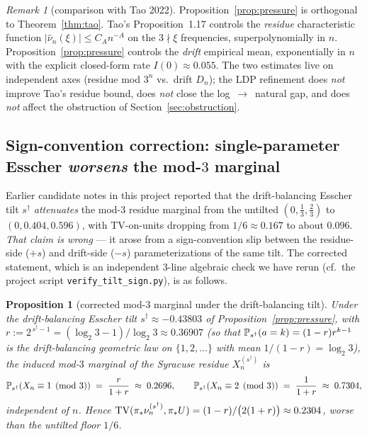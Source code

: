 \documentclass[11pt]{amsart}
\newtheorem{proposition}[theorem]{Proposition}
\theoremstyle{definition}
\theoremstyle{remark}
\newtheorem{remark}[theorem]{Remark}
\begin{document}
\begin{remark}[comparison with Tao 2022]\label{rem:tao-compare}
Proposition~\ref{prop:pressure} is orthogonal to Theorem~\ref{thm:tao}. Tao's Proposition~1.17 controls
the \emph{residue} characteristic function $|\widehat\nu_n(\xi)|\le C_A n^{-A}$ on the $3\nmid\xi$
frequencies, superpolynomially in $n$. Proposition~\ref{prop:pressure} controls the \emph{drift}
empirical mean, exponentially in $n$ with the explicit closed-form rate $I(0)\approx 0.055$. The two
estimates live on independent axes (residue mod $3^n$ vs.\ drift $D_n$); the LDP refinement does
\emph{not} improve Tao's residue bound, does \emph{not} close the log~$\to$~natural gap, and does
\emph{not} affect the obstruction of Section~\ref{sec:obstruction}.
\end{remark}

\subsection{Sign-convention correction: single-parameter Esscher \emph{worsens} the mod-$3$ marginal}

Earlier candidate notes in this project reported that the drift-balancing Esscher tilt $s^\dagger$
\emph{attenuates} the mod-$3$ residue marginal from the untilted $(0,\tfrac13,\tfrac23)$ to
$(0,0.404,0.596)$, with TV-on-units dropping from $1/6\approx 0.167$ to about $0.096$. \emph{That claim
is wrong} --- it arose from a sign-convention slip between the residue-side ($+s$) and drift-side ($-s$)
parameterizations of the same tilt. The corrected statement, which is an independent 3-line algebraic
check we have rerun (cf.\ the project script \texttt{verify\_tilt\_sign.py}), is as follows.

\begin{proposition}[corrected mod-$3$ marginal under the drift-balancing tilt]\label{prop:signfix}
Under the drift-balancing Esscher tilt $s^\dagger\approx -0.43803$ of Proposition~\ref{prop:pressure},
with $r:=2^{\,s^\dagger-1}=(\log_2 3-1)/\log_2 3\approx 0.36907$ (so that
$\mathbb{P}_{s^\dagger}(a=k)=(1-r)r^{k-1}$ is the drift-balancing geometric law on $\{1,2,\dots\}$ with
mean $1/(1-r)=\log_2 3$), the induced mod-$3$ marginal of the Syracuse residue $X_n^{(s^\dagger)}$ is
\[
  \mathbb{P}_{s^\dagger}(X_n\equiv 1\pmod 3)\;=\;\frac{r}{1+r}\;\approx\;0.2696,
  \qquad
  \mathbb{P}_{s^\dagger}(X_n\equiv 2\pmod 3)\;=\;\frac{1}{1+r}\;\approx\;0.7304,
\]
independent of $n$. Hence
$\mathrm{TV}(\pi_*\nu_n^{(s^\dagger)},\pi_*U)=(1-r)/\bigl(2(1+r)\bigr)\approx 0.2304$, \emph{worse} than the
untilted floor $1/6$.
\end{proposition}
\end{document}
